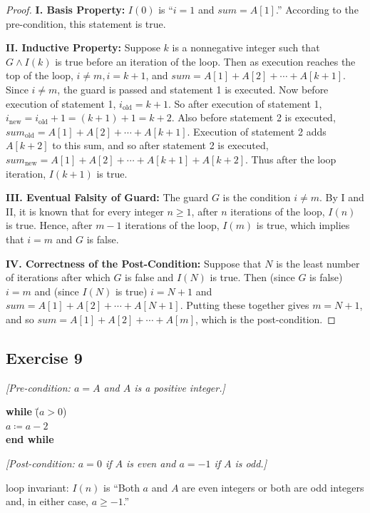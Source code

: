 \documentclass[14pt]{extarticle}
\begin{document}
\begin{proof}
{\bf I. Basis Property:} $I(0)$ is “$i = 1$ and $sum = A[1]$.” According to the pre-condition, this statement is true. 

{\bf II. Inductive Property:} Suppose $k$ is a nonnegative integer such that $G \wedge I(k)$ is true before an iteration of the loop. Then as execution reaches the top of the loop, $i \neq m, i = k + 1$, and $sum = A[1] + A[2] + \cdots + A[k+1]$. Since $i \neq m$, the guard is passed and statement 1 is executed. Now before execution of statement 1, $i_{\text{old}} = k + 1$. So after execution of statement 1, $i_{\text{new}} = i_{\text{old}} + 1 = (k + 1) + 1 = k + 2$. Also before statement 2 is executed, $sum_{\text{old}} = A[1] + A[2] + \cdots + A[k+1]$. Execution of statement 2 adds $A[k + 2]$ to this sum, and so after statement 2 is executed, $sum_{\text{new}} = A[1] + A[2] + \cdots + A[k + 1] + A[k + 2]$. Thus after the loop iteration, $I(k + 1)$ is true. 

{\bf III. Eventual Falsity of Guard:} The guard $G$ is the condition $i \neq m$. By I and II, it is known that for every integer $n \geq 1$, after $n$ iterations of the loop, $I(n)$ is true. Hence, after $m - 1$ iterations of the loop, $I(m)$ is true, which implies that $i = m$ and $G$ is false. 

{\bf IV. Correctness of the Post-Condition:} Suppose that $N$ is the least number of iterations after which $G$ is false and $I(N)$ is true. Then (since $G$ is false) $i = m$ and (since $I(N)$ is true) $i = N + 1$ and $sum = A[1] + A[2] + \cdots + A[N+1]$. Putting these together gives $m = N + 1$, and so $sum = A[1] + A[2] + \cdots + A[m]$, which is the post-condition.
\end{proof}

\subsection{Exercise 9}
{\it [Pre-condition: $a = A$ and $A$ is a positive integer.]}

\begin{tabbing}
{\bf while} \= ($a > 0$) \\
            \> $a \coloneqq a - 2$ \\
{\bf end while}
\end{tabbing}

{\it [Post-condition: $a = 0$ if $A$ is even and $a = -1$ if $A$ is odd.]}

loop invariant: $I(n)$ is ``Both $a$ and $A$ are even integers or both are odd integers and, in either case, $a \geq -1$.''
\end{document}
